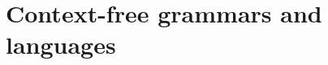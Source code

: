 

\setcounter{section}{5}
\setcounter{subsection}{1}
\setcounter{dfn}{0}

\section{Context-free grammars and languages}


